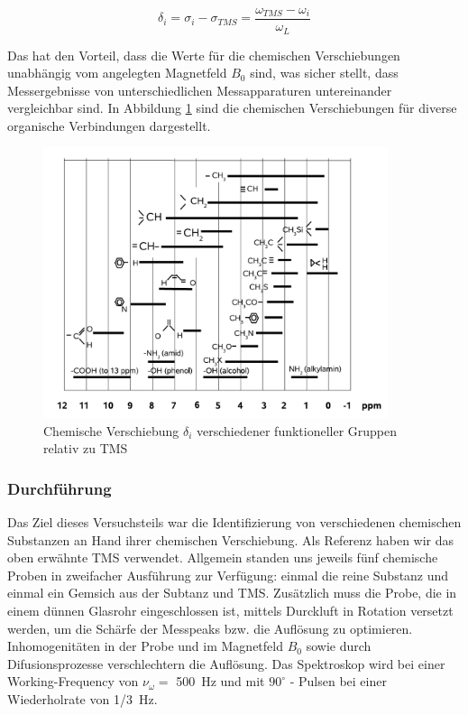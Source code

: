 \documentclass[a4paper]{scrartcl} %
\begin{document}
\begin{equation}
	\delta_i = \sigma_i -\sigma_{TMS} = \frac{\omega_{TMS} - \omega_i}{\omega_L}
	\label{eq:delta_i}
\end{equation}

Das hat den Vorteil, dass die Werte für die chemischen Verschiebungen unabhängig vom angelegten Magnetfeld $B_0$ sind, was sicher stellt, dass Messergebnisse von unterschiedlichen Messapparaturen untereinander vergleichbar sind.
In Abbildung \ref{fig:chem_shift} sind die chemischen Verschiebungen für diverse organische Verbindungen dargestellt.

\begin{figure}[htbp]
	\centering
	\includegraphics[width= 0.9\textwidth]{./Resources/chem_shifts.png}
	\caption{Chemische Verschiebung $\delta_i$ verschiedener funktioneller Gruppen relativ zu TMS \autocite{skript}}
	\label{fig:chem_shift}
\end{figure}


\subsubsection{Durchführung}

Das Ziel dieses Versuchsteils war die Identifizierung von verschiedenen chemischen Substanzen an Hand ihrer chemischen Verschiebung. Als Referenz haben wir das oben erwähnte TMS verwendet. Allgemein standen uns jeweils fünf chemische Proben in zweifacher Ausführung zur Verfügung: einmal die reine Substanz und einmal ein Gemsich aus der Subtanz und TMS. Zusätzlich muss die Probe, die in einem dünnen Glasrohr eingeschlossen ist, mittels Durckluft in Rotation versetzt werden, um die Schärfe der Messpeaks bzw. die Auflösung zu optimieren. Inhomogenitäten in der Probe und im Magnetfeld $B_0$ sowie durch Difusionsprozesse verschlechtern die Auflösung. Das Spektroskop wird bei einer Working-Frequency von $\nu_{\omega} = $ \SI{500}{Hz} und mit $90^{\circ}$ - Pulsen bei einer Wiederholrate von \SI{1/3}{Hz}.
\end{document}
